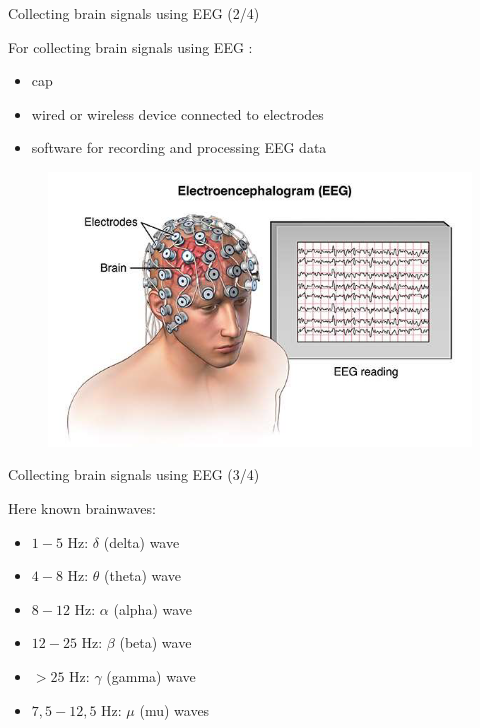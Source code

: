 \documentclass{beamer}
\begin{document}
\begin{frame}
{\centerline{Collecting brain signals using EEG (2/4)}}
    For collecting brain signals using EEG :
    \begin{itemize}
        \item cap
        \item wired or wireless device connected to electrodes
        \item software for recording and processing EEG data
    \end{itemize}
    \begin{figure}
        \centering
        \includegraphics[width=\linewidth]{P2023.AIBCCSS.BrainSignals/EEG reading.png}
    \end{figure}
\end{frame}

\begin{frame}
{\centerline{Collecting brain signals using EEG (3/4)}}
Here known brainwaves:
\begin{itemize}
    \item $1-5$ Hz: $\delta$ (delta) wave
    \item $4-8$ Hz: $\theta$ (theta) wave
    \item $8-12$ Hz: $\alpha$ (alpha) wave
    \item $12-25$ Hz: $\beta$ (beta) wave
    \item $> 25$ Hz: $\gamma$ (gamma) wave
    \item $7,5-12,5$ Hz: $\mu$ (mu) waves
\end{itemize}
\end{frame}
\end{document}

